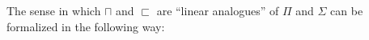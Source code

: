 \begin{comment}
  Another example takes inspiration from the realm of blockchain technology, where one deals with resources like bitcoin or ether balances. Say we model ownership of ether by a public address (generated from a cryptographic public key) having the linear type $addr_1 : ETH$. Then we can model a decentralized  mathematical prize comittee, which give out a reward of 1 ether to whoever proves the Goldbach conjecture.

  
Since the reward is constant, this is not truly a dependent linear function and we abusively notate it by $\multimap$:
\[
\cdot; x : ETH \vdash GoldbachReward: \Pi_{x : \mathbb{N}}\Sigma_{y, z : \mathbb{N}}Prime(y) \times Prime(z) \times y + z =_{\mathbb{B}} 2(suc(suc(x))) \multimap ETH
\]
To execute such a function and receive the reward, one would need to exhibit that there is an address $x$ with one ether to begin with and provide a proof of the Goldbach conjecture.


\end{comment}
The sense in which $\sqcap$ and $\sqsubset$ are ``linear analogues'' of $\Pi$ and $\Sigma$ can be formalized in the following way:
